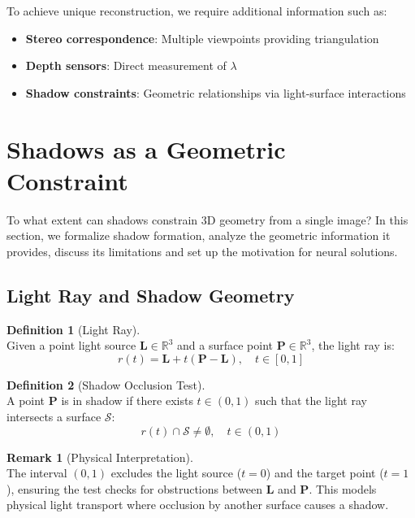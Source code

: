 \documentclass[12pt]{article}
\newcommand{\R}{\mathbb{R}}
\newcommand{\vect}[1]{\bm{#1}}
\theoremstyle{definition}
\newtheorem{definition}{Definition}[subsection]
\newtheorem{remark}{Remark}[subsection]
\begin{document}
To achieve unique reconstruction, we require additional information such as:
\begin{itemize}
    \item \textbf{Stereo correspondence}: Multiple viewpoints providing triangulation
    \item \textbf{Depth sensors}: Direct measurement of $\lambda$
    \item \textbf{Shadow constraints}: Geometric relationships via light-surface interactions
\end{itemize}

\section{Shadows as a Geometric Constraint} \label{sec:shadows}

To what extent can shadows constrain 3D geometry from a single image? In this section, we formalize shadow formation, analyze the geometric information it provides, discuss its limitations and set up the motivation for neural solutions.

\subsection{Light Ray and Shadow Geometry} \label{sec:light_ray_geometry}

\begin{definition}[Light Ray] \label{def:light_ray} ~\\
Given a point light source $\vect{L} \in \R^3$ and a surface point $\vect{P} \in \R^3$, the light ray is:
\begin{equation}
\boxed{r(t) = \vect{L} + t(\vect{P} - \vect{L}), \quad t \in [0,1]} \label{eq:light_ray}
\end{equation}
\end{definition}

\begin{definition}[Shadow Occlusion Test] \label{def:shadow_occlusion} ~\\
A point $\vect{P}$ is in shadow if there exists $t \in (0,1)$ such that the light ray intersects a surface $\mathcal{S}$:
\begin{equation}
\boxed{r(t) \cap \mathcal{S} \neq \emptyset, \quad t \in (0,1)}
\end{equation}
\end{definition}

\begin{remark}[Physical Interpretation] \label{rmk:occlusion_physics} ~\\
The interval $(0,1)$ excludes the light source ($t=0$) and the target point ($t=1$), ensuring the test checks for obstructions between $\vect{L}$ and $\vect{P}$. This models physical light transport where occlusion by another surface causes a shadow.
\end{remark}
\end{document}
